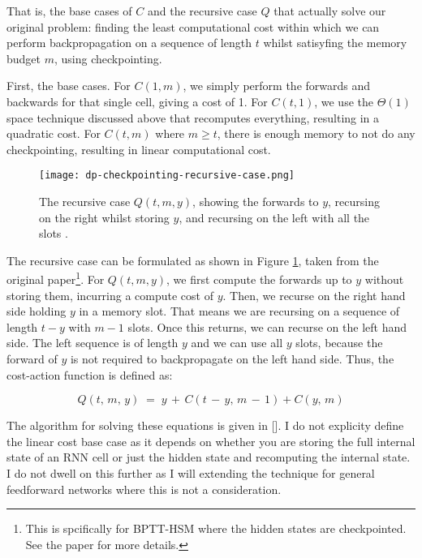 That is, the base cases of \(C\) and the recursive case \(Q\) that actually solve our original problem: finding the least computational cost within which we can perform backpropagation on a sequence of length \(t\) whilst satisyfing the memory budget \(m\), using checkpointing.

First, the base cases. 
For \(C(1, m)\), we simply perform the forwards and backwards for that single cell, giving a cost of 1.
For \(C(t, 1)\), we use the \(\Theta(1)\) space technique discussed above that recomputes everything, resulting in a quadratic cost.
For \(C(t, m)\) where \(m \geq t\), there is enough memory to not do any checkpointing, resulting in linear computational cost.

\begin{figure}[thb]
    \centering
    \texttt{[image: dp-checkpointing-recursive-case.png]}
    \caption{The recursive case \(Q(t, m, y)\), showing the forwards to \(y\), recursing on the right whilst storing \(y\), and recursing on the left with all the slots \cite[Figure~1]{Gruslys2016}.}
    \label{fig:2-dp-checkpointing-rec}
\end{figure}

The recursive case can be formulated as shown in Figure \ref{fig:2-dp-checkpointing-rec}, taken from the original paper\footnote{This is spcifically for BPTT-HSM where the hidden states are checkpointed. See the paper for more details.}.
For \(Q(t, m, y)\), we first compute the forwards up to \(y\) without storing them, incurring a compute cost of \(y\).
Then, we recurse on the right hand side holding \(y\) in a memory slot.
That means we are recursing on a sequence of length \(t-y\) with \(m-1\) slots.
Once this returns, we can recurse on the left hand side.
The left sequence is of length \(y\) and we can use all \(y\) slots, because the forward of \(y\) is not required to backpropagate on the left hand side.
Thus, the cost-action function is defined as:

\begin{equation*}
    Q(t,\, m,\, y) \;=\; y \,+\, C(t\,-\,y,\, m\,-\,1) + C(y,\, m)
\end{equation*}

The algorithm for solving these equations is given in [].
I do not explicity define the linear cost base case as it depends on whether you are storing the full internal state of an RNN cell or just the hidden state and recomputing the internal state.
I do not dwell on this further as I will extending the technique for general feedforward networks where this is not a consideration.
